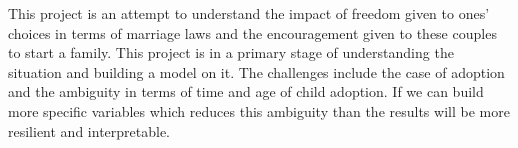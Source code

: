 \documentclass[11pt, a4paper, leqno]{article}
\begin{document}
This project is an attempt to understand the impact of freedom given to ones' choices in terms of marriage laws and the encouragement given to
these couples to start a family. This project is in a primary stage of understanding the situation and building a model on it. The challenges
include the case of adoption and the ambiguity in terms of time and age of child adoption. If we can build more specific variables which reduces
this ambiguity than the results will be more resilient and interpretable.


% 

\nocite{*}
\printbibliography
{}



\end{document}
